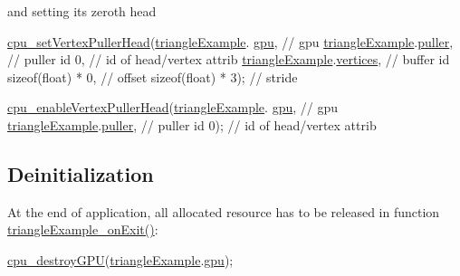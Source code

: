 and setting its zeroth head 
\begin{DoxyCodeInclude}
  \hyperlink{vertexPuller_8h_a07be46ae38b8ec80ec85581a33b02786}{cpu\_setVertexPullerHead}(\hyperlink{triangleExample_8c_a235d77635ad30ec86f81d2caabbdc1b5}{triangleExample}.
      \hyperlink{structTriangleExampleVariables_a6c5c3f82065ae9aac07f9e6f11dd03b3}{gpu},       \textcolor{comment}{// gpu}
                          \hyperlink{triangleExample_8c_a235d77635ad30ec86f81d2caabbdc1b5}{triangleExample}.\hyperlink{structTriangleExampleVariables_a82e39dd0d18fc57422686229d801e39f}{puller},    \textcolor{comment}{// puller id}
                          0,                         \textcolor{comment}{// id of head/vertex attrib}
                          \hyperlink{triangleExample_8c_a235d77635ad30ec86f81d2caabbdc1b5}{triangleExample}.\hyperlink{structTriangleExampleVariables_acb7968b625f2e01866994769209cf32e}{vertices},  \textcolor{comment}{// buffer id}
                          \textcolor{keyword}{sizeof}(\textcolor{keywordtype}{float}) * 0,         \textcolor{comment}{// offset}
                          \textcolor{keyword}{sizeof}(\textcolor{keywordtype}{float}) * 3);        \textcolor{comment}{// stride}

  \hyperlink{vertexPuller_8h_afc4c70416bc0e515e75ec90c8c8d1584}{cpu\_enableVertexPullerHead}(\hyperlink{triangleExample_8c_a235d77635ad30ec86f81d2caabbdc1b5}{triangleExample}.
      \hyperlink{structTriangleExampleVariables_a6c5c3f82065ae9aac07f9e6f11dd03b3}{gpu},     \textcolor{comment}{// gpu}
                             \hyperlink{triangleExample_8c_a235d77635ad30ec86f81d2caabbdc1b5}{triangleExample}.\hyperlink{structTriangleExampleVariables_a82e39dd0d18fc57422686229d801e39f}{puller},  \textcolor{comment}{// puller id}
                             0);  \textcolor{comment}{// id of head/vertex attrib}
\end{DoxyCodeInclude}
\hypertarget{triangleExample.c_Deinitialization}{}\subsection{Deinitialization}\label{triangleExample.c_Deinitialization}
At the end of application, all allocated resource has to be released in function \hyperlink{triangleExample_8c_a35b10f59fe16423447777ba6bbba3b66}{triangle\-Example\-\_\-on\-Exit()}\-: 
\begin{DoxyCodeInclude}
  \hyperlink{gpu_8h_aefa64b1f8ea2c83b8c80c68089739dc1}{cpu\_destroyGPU}(\hyperlink{triangleExample_8c_a235d77635ad30ec86f81d2caabbdc1b5}{triangleExample}.\hyperlink{structTriangleExampleVariables_a6c5c3f82065ae9aac07f9e6f11dd03b3}{gpu});
\end{DoxyCodeInclude}
